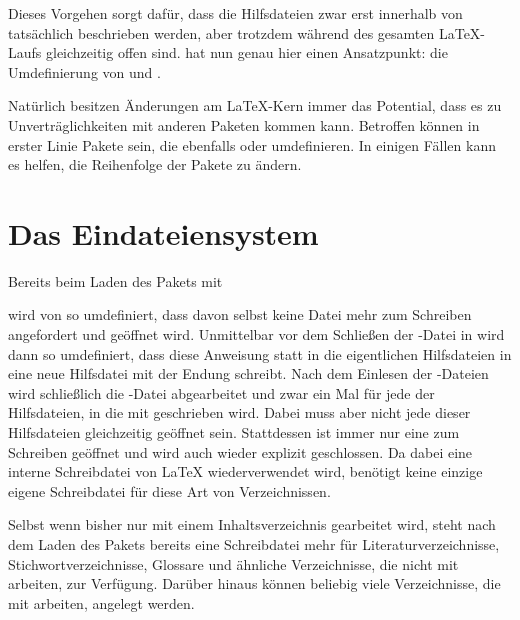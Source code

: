 Dieses Vorgehen sorgt dafür, dass die Hilfsdateien zwar erst innerhalb von
 tatsächlich beschrieben werden, aber trotzdem
während des gesamten \LaTeX-Laufs gleichzeitig offen sind. 
hat nun genau hier einen Ansatzpunkt: die Umdefinierung von 
und .

Natürlich besitzen Änderungen am \LaTeX-Kern immer das
Potential, dass es zu Unverträglichkeiten mit anderen Paketen kommen
kann. Betroffen können in erster Linie Pakete sein, die ebenfalls
 oder  umdefinieren. In einigen Fällen kann
es helfen, die Reihenfolge der Pakete zu ändern.%
\iffalse %
\ Wenn Sie auf ein solches Problem stoßen, sollten Sie sich an den
\KOMAScript-Autor wenden.5
\fi

\section{Das Eindateiensystem}

Bereits beim Laden des Pakets mit
\begin{lstcode}
  \usepackage{scrwfile}
\end{lstcode}
wird  von  so
umdefiniert, dass davon selbst keine Datei mehr zum Schreiben angefordert und
geöffnet wird. Unmittelbar vor dem Schließen der -Datei in
 wird dann  so umdefiniert,
dass diese Anweisung statt in die eigentlichen Hilfsdateien in eine neue
Hilfsdatei mit der Endung  schreibt. Nach dem Einlesen der
-Dateien wird schließlich die -Datei abgearbeitet und zwar
ein Mal für jede der Hilfsdateien, in die mit  geschrieben
wird. Dabei muss aber nicht jede dieser Hilfsdateien gleichzeitig
geöffnet sein. Stattdessen ist immer nur eine zum Schreiben geöffnet und wird
auch wieder explizit geschlossen. Da dabei eine interne Schreibdatei von
\LaTeX{} wiederverwendet wird, benötigt  keine einzige
eigene Schreibdatei für diese Art von Verzeichnissen.

Selbst wenn bisher nur mit einem Inhaltsverzeichnis gearbeitet wird, steht
nach dem Laden des Pakets bereits eine Schreibdatei mehr für
Literaturverzeichnisse, Stichwortverzeichnisse, Glossare und ähnliche
Verzeichnisse, die nicht mit  arbeiten, zur
Verfügung. Darüber hinaus können beliebig viele Verzeichnisse, die mit
 arbeiten, angelegt werden.%
%

